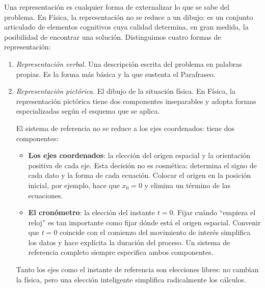 \documentclass[11pt]{book}
\begin{document}
\begin{enumerate}
Una representación es cualquier forma de externalizar lo que se sabe del problema. En Física, la representación no se reduce a un dibujo: es un conjunto articulado de elementos cognitivos cuya calidad determina, en gran medida, la posibilidad de encontrar una solución. Distinguimos cuatro formas de representación:

\begin{enumerate}
    \item {\it Representación verbal.} Una descripción escrita del problema en palabras propias. Es la forma más básica y la que sustenta el Parafraseo.

    \item {\it Representación pictórica.} El dibujo de la situación física. En Física, la representación pictórica tiene dos componentes inseparables y adopta formas especializadas según el esquema que se aplica.

    \medskip

    El sistema de referencia no se reduce a los ejes coordenados: tiene dos componentes:
    \begin{itemize}
        \item {\bf Los ejes coordenados}: la elección del origen espacial y la orientación positiva de cada eje. Esta decisión no es cosmética: determina el signo de cada dato y la forma de cada ecuación. Colocar el origen en la posición inicial, por ejemplo, hace que $x_0 = 0$ y elimina un término de las ecuaciones.
        \item {\bf El cronómetro}: la elección del instante $t = 0$. Fijar cuándo ``empieza el reloj'' es tan importante como fijar dónde está el origen espacial. Convenir que $t = 0$ coincide con el comienzo del movimiento de interés simplifica los datos y hace explícita la duración del proceso. Un sistema de referencia completo siempre especifica ambos componentes.
    \end{itemize}

    Tanto los ejes como el instante de referencia son elecciones libres: no cambian la física, pero una elección inteligente simplifica radicalmente los cálculos.

    \medskip


\end{enumerate}
\end{enumerate}
\end{document}

